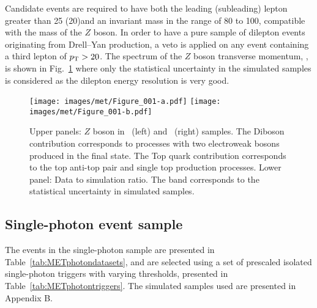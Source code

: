 Candidate events are required to have both the leading (subleading) lepton \pt greater than 25 (20)\GeV and an invariant mass in the range of 80 to 100\GeV, compatible with the mass of the 
$Z$ boson.
In order to have a pure sample of dilepton events originating from Drell--Yan production, a veto is applied on any event containing a third lepton of $p_{\mathrm{T}} > 20$\GeV. 
The spectrum of the $Z$ boson transverse momentum, \qt, is shown in Fig.~\ref{fig:zbosonpt} where only the statistical uncertainty in the simulated samples is considered as the dilepton energy resolution is very good.
\begin{figure}[!htb]
  \centering
  \texttt{[image: images/met/Figure\_001-a.pdf]}
  \texttt{[image: images/met/Figure\_001-b.pdf]}
  \caption{Upper panels: $Z$ boson \qt in \Zmm\ (left) and \Zee\ (right) samples. The Diboson contribution corresponds to processes with two electroweak bosons produced in the final state. The Top quark contribution corresponds to the top anti-top pair and single top production processes. Lower panel: Data to simulation ratio. The band corresponds to the statistical uncertainty in simulated samples. }
  \label{fig:zbosonpt}
\end{figure}
\subsection*{Single-photon event sample}
\noindent
\justify
\label{sec:photonselection}
The events in the single-photon sample are presented in Table~\ref{tab:METphotondatasets}, and are selected using a set of prescaled isolated single-photon triggers with varying thresholds, presented in Table~\ref{tab:METphotontriggers}. The simulated samples used are presented in Appendix B. 

